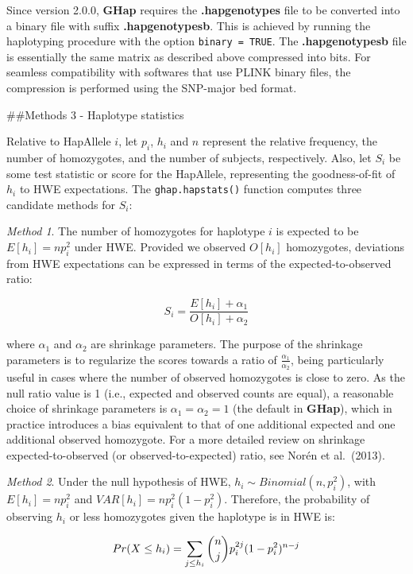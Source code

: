 \documentclass[
]{article}
\begin{document}
Since version 2.0.0, \textbf{GHap} requires the \textbf{.hapgenotypes}
file to be converted into a binary file with suffix
\textbf{.hapgenotypesb}. This is achieved by running the haplotyping
procedure with the option \texttt{binary\ =\ TRUE}. The
\textbf{.hapgenotypesb} file is essentially the same matrix as described
above compressed into bits. For seamless compatibility with softwares
that use PLINK binary files, the compression is performed using the
SNP-major bed format.

\pagebreak

\#\#Methods 3 - Haplotype statistics

Relative to HapAllele \(i\), let \(p_i\), \(h_i\) and \(n\) represent
the relative frequency, the number of homozygotes, and the number of
subjects, respectively. Also, let \(S_i\) be some test statistic or
score for the HapAllele, representing the goodness-of-fit of \(h_i\) to
HWE expectations. The \texttt{ghap.hapstats()} function computes three
candidate methods for \(S_i\):

\emph{Method 1}. The number of homozygotes for haplotype \(i\) is
expected to be \(E[h_i] = np_i^2\) under HWE. Provided we observed
\(O[h_i]\) homozygotes, deviations from HWE expectations can be
expressed in terms of the expected-to-observed ratio:

\[S_i = \dfrac{E[h_i] + \alpha_1}{O[h_i] + \alpha_2}\]

where \(\alpha_1\) and \(\alpha_2\) are shrinkage parameters. The
purpose of the shrinkage parameters is to regularize the scores towards
a ratio of \(\frac{\alpha_1}{\alpha_2}\), being particularly useful in
cases where the number of observed homozygotes is close to zero. As the
null ratio value is 1 (i.e., expected and observed counts are equal), a
reasonable choice of shrinkage parameters is \(\alpha_1 = \alpha_2 = 1\)
(the default in \textbf{GHap}), which in practice introduces a bias
equivalent to that of one additional expected and one additional
observed homozygote. For a more detailed review on shrinkage
expected-to-observed (or observed-to-expected) ratio, see Norén et
al.~(2013).

\emph{Method 2}. Under the null hypothesis of HWE,
\(h_i \sim Binomial(n,p_i^2)\), with \(E[h_i] = np_i^2\) and
\(VAR[h_i] = np_i^2(1-p_i^2)\). Therefore, the probability of observing
\(h_i\) or less homozygotes given the haplotype is in HWE is:

\[Pr(X \leq h_i) = \sum\limits_{j \leq h_i}^{} \dbinom{n}{j} p_i^{2j} (1-p_i^2)^{n-j}\]
\end{document}
